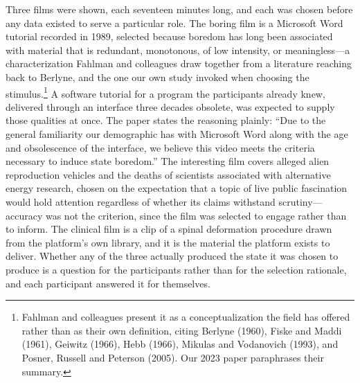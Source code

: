 Three films were shown, each seventeen minutes long, and each was chosen before any data
existed to serve a particular role. The boring film is a Microsoft Word tutorial recorded in
1989, selected because boredom has long been associated with material that is redundant,
monotonous, of low intensity, or meaningless---a characterization Fahlman and colleagues draw
together from a literature reaching back to Berlyne, and the one our own study invoked when
choosing the stimulus.\footnote{Fahlman and colleagues present it as a conceptualization the
field has offered rather than as their own definition, citing Berlyne (1960), Fiske and Maddi
(1961), Geiwitz (1966), Hebb (1966), Mikulas and Vodanovich (1993), and Posner, Russell and
Peterson (2005). Our 2023 paper paraphrases their summary.} A software
tutorial for a program the participants already knew, delivered through an interface three
decades obsolete, was expected to supply those qualities at once. The paper states the
reasoning plainly: ``Due to the general familiarity our demographic has with Microsoft Word
along with the age and obsolescence of the interface, we believe this video meets the criteria
necessary to induce state boredom.'' The interesting film covers alleged alien reproduction
vehicles and the deaths of scientists associated with alternative energy research, chosen on
the expectation that a topic of live public fascination would hold attention regardless of
whether its claims withstand scrutiny---accuracy was not the criterion, since the film was
selected to engage rather than to inform. The clinical film is a clip of a spinal deformation
procedure drawn from the platform's own library, and it is the material the platform exists to
deliver. Whether any of the three actually produced the state it was chosen to produce is a
question for the participants rather than for the selection rationale, and each participant
answered it for themselves.

